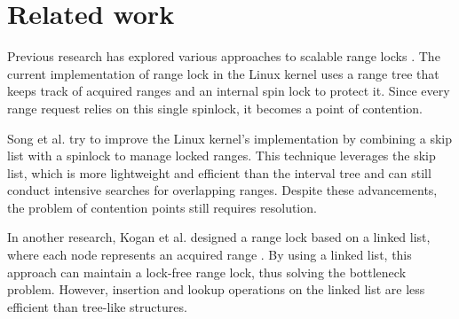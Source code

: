 
\chapter{Related work}\label{chapter:relatedwork}

Previous research has explored various approaches to scalable range locks \parencite{linuxRangeLockImpl2013, song2013parallelizing, kogan2020scalable}. The current implementation of range lock in the Linux kernel uses a range tree that keeps track of acquired ranges and an internal spin lock to protect it\parencite{linuxRangeLockImpl2013}. Since every range request relies on this single spinlock, it becomes a point of contention. 

Song et al. try to improve the Linux kernel's implementation by combining a skip list with a spinlock to manage locked ranges\parencite{song2013parallelizing}. This technique leverages the skip list, which is more lightweight and efficient than the interval tree and can still conduct intensive searches for overlapping ranges. Despite these advancements, the problem of contention points still requires resolution.

In another research, Kogan et al. designed a range lock based on a linked list, where each node represents an acquired range \parencite{kogan2020scalable}. By using a linked list, this approach can maintain a lock-free range lock, thus solving the bottleneck problem. However, insertion and lookup operations on the linked list are less efficient than tree-like structures. 
